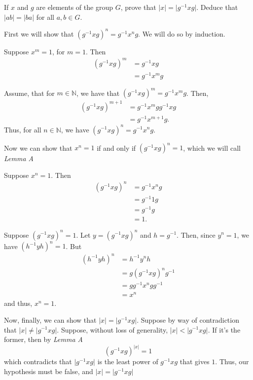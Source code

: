 \documentclass[12 pt, letterpaper]{hmcpset}
\begin{document}
\pagebreak

\begin{problem}
	If $x$ and $g$ are elements of the group $G$, prove that $\lvert x \rvert = \vert g^{-1} x g \rvert$. Deduce that $\lvert a b \rvert = \lvert b a \rvert$ for all $a, b \in G$.
\end{problem}

\begin{solution}
	First we will show that $(g^{-1} x g)^n = g^{-1} x^n g$. We will do so by induction. 

	Suppose $x^m = 1$, for $m = 1$. Then
	\[
		\begin{split}
			(g^{-1} x g)^m & = g^{-1} x g \\
				       & = g^{-1} x^m g
		\end{split}
	\] 

	Assume, that for $m \in \mathbb N$, we have that $(g^{-1} x g)^m = g^{-1} x^m g$. Then,
	\[
		\begin{split}
			(g^{-1} x g)^{m + 1} & =  g^{-1} x^m g g^{-1} x g \\
					     & = g^{-1} x^{m + 1} g.
		\end{split}
	\]
	Thus, for all $n \in \mathbb N$, we have $(g^{-1} x g)^n = g^{-1} x^n g$. 

	Now we can show that $x^n = 1$ if and only if $(g^{-1} x g)^n = 1$, which we will call \textit{Lemma A}

	Suppose $x^n = 1$. Then
	\[
		\begin{split}
			(g^{-1} x g)^n & = g^{-1} x^n g \\
				       & = g^{-1} 1 g \\
				       & = g^{-1} g \\
				       & = 1.
		\end{split}
	\] 

	Suppose $(g^{-1} x g)^n = 1$. Let $y = (g^{-1} x g)^n$ and $h = g^{-1}$. Then, since $y^n = 1$, we have $(h^{-1} y h)^n = 1$. But
	\[
		\begin{split}
			(h^{-1} y h)^n & = h^{-1} y^n h \\
				       & = g (g^{-1} x g)^n g^{-1} \\
				       & = g g^{-1} x^n g g^{-1} \\
				       & = x^n
		\end{split}
	\]
	and thus, $x^n = 1$. 

	Now, finally, we can show that $\lvert x \rvert = \lvert g^{-1} x g \rvert$. Suppose by way of contradiction that $\lvert x \rvert \neq \lvert g^{-1} x g \rvert$. Suppose, without loss of generality, $\lvert x \rvert < \lvert g^{-1} x g \rvert$. If it's the former, then by \textit{Lemma A}
	\[
		(g^{-1} x g)^{\lvert x \rvert} = 1
	\]
	which contradicts that $\lvert g^{-1} x g \rvert$ is the least power of $g^{-1} x g$ that gives $1$. Thus, our hypothesis must be false, and $\lvert x \rvert = \lvert g^{-1} x g \rvert$
\end{solution}
\end{document}
